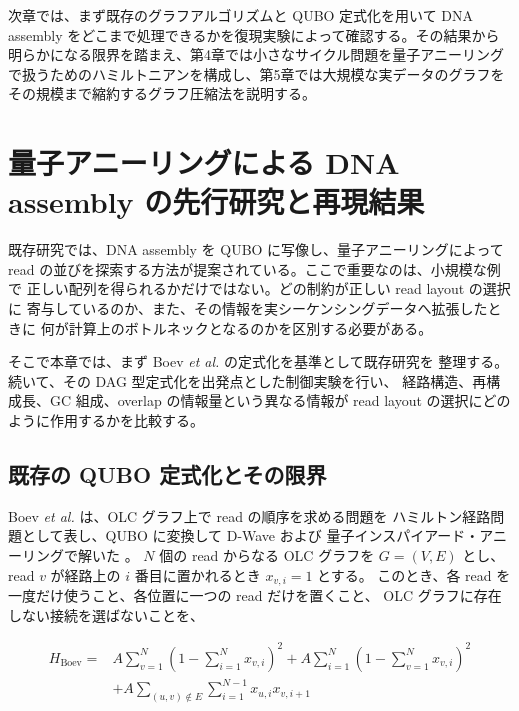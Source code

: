 \documentclass[a4j,10pt]{ujarticle}
\begin{document}
次章では、まず既存のグラフアルゴリズムと QUBO 定式化を用いて DNA assembly をどこまで処理できるかを復現実験によって確認する。その結果から明らかになる限界を踏まえ、第4章では小さなサイクル問題を量子アニーリングで扱うためのハミルトニアンを構成し、第5章では大規模な実データのグラフをその規模まで縮約するグラフ圧縮法を説明する。

\section{量子アニーリングによる DNA assembly の先行研究と再現結果}

既存研究では、DNA assembly を QUBO に写像し、量子アニーリングによって
read の並びを探索する方法が提案されている。ここで重要なのは、小規模な例で
正しい配列を得られるかだけではない。どの制約が正しい read layout の選択に
寄与しているのか、また、その情報を実シーケンシングデータへ拡張したときに
何が計算上のボトルネックとなるのかを区別する必要がある。

そこで本章では、まず Boev \textit{et al.} の定式化を基準として既存研究を
整理する。続いて、その DAG 型定式化を出発点とした制御実験を行い、
経路構造、再構成長、GC 組成、overlap の情報量という異なる情報が
read layout の選択にどのように作用するかを比較する。


\subsection{既存の QUBO 定式化とその限界}

Boev \textit{et al.} は、OLC グラフ上で read の順序を求める問題を
ハミルトン経路問題として表し、QUBO に変換して D-Wave および
量子インスパイアード・アニーリングで解いた \cite{boev2021genome}。
$N$ 個の read からなる OLC グラフを $G=(V,E)$ とし、
read $v$ が経路上の $i$ 番目に置かれるとき $x_{v,i}=1$ とする。
このとき、各 read を一度だけ使うこと、各位置に一つの read だけを置くこと、
OLC グラフに存在しない接続を選ばないことを、

\begin{equation}
\begin{aligned}
H_{\mathrm{Boev}}
={}&
A\sum_{v=1}^{N}
\left(
1-\sum_{i=1}^{N}x_{v,i}
\right)^2
+
A\sum_{i=1}^{N}
\left(
1-\sum_{v=1}^{N}x_{v,i}
\right)^2
\\
&+
A\sum_{(u,v)\notin E}
\sum_{i=1}^{N-1}
x_{u,i}x_{v,i+1}
\end{aligned}
\label{eq:boev_hamiltonian}
\end{equation}
\end{document}
